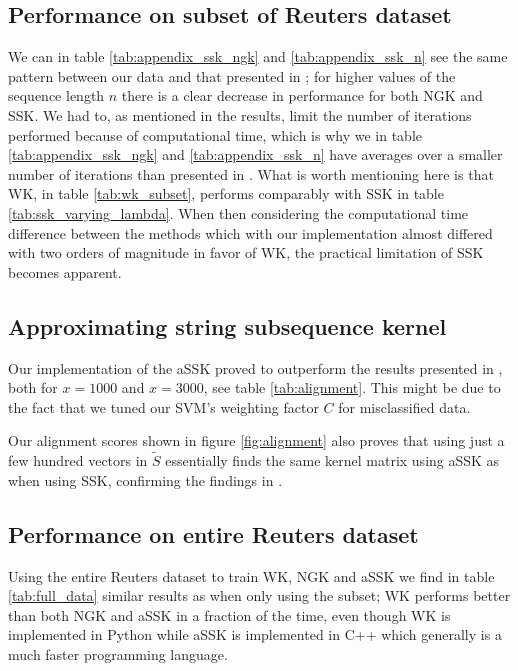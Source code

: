 \subsection{Performance on subset of Reuters dataset}
We can in table \ref{tab:appendix_ssk_ngk} and \ref{tab:appendix_ssk_n} see the same pattern between our data and that presented in \cite{lodhi}; for higher values of the sequence length $ n $ there is a clear decrease in performance for both NGK and SSK. We had to, as mentioned in the results, limit the number of iterations performed because of computational time, which is why we in table \ref{tab:appendix_ssk_ngk} and \ref{tab:appendix_ssk_n}  have averages over a smaller number of iterations than presented in \cite{lodhi}. What is worth mentioning here is that WK, in table \ref{tab:wk_subset}, performs comparably with SSK in table \ref{tab:ssk_varying_lambda}. When then considering the computational time difference between the methods which with our implementation almost differed with two orders of magnitude in favor of WK, the practical limitation of SSK becomes apparent. %

\subsection{Approximating string subsequence kernel}
Our implementation of the aSSK proved to outperform the results presented in \cite{lodhi}, both for $ x=1000 $ and $ x=3000 $, see table \ref{tab:alignment}. This might be due to the fact that we tuned our SVM's weighting factor $ C $ for misclassified data. 

Our alignment scores shown in figure \ref{fig:alignment} also proves that using just a few hundred vectors in $ \tilde{S} $ essentially finds the same kernel matrix using aSSK as when using SSK, confirming the findings in \cite{lodhi}.

\subsection{Performance on entire Reuters dataset}
Using the entire Reuters dataset to train WK, NGK and aSSK we find in table \ref{tab:full_data} similar results as when only using the subset; WK performs better than both NGK and aSSK in a fraction of the time, even though WK is implemented in Python while aSSK is implemented in C++ which generally is a much faster programming language. 


